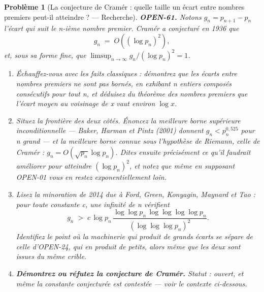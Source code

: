 \documentclass[11pt]{article}
\newtheorem{problem}{Problème}
\begin{document}
\begin{problem}[{La conjecture de Cramér : quelle taille un écart entre nombres premiers peut-il atteindre ? --- Recherche}]
\textbf{OPEN-61.} Notons $ g_n = p_{n+1} - p_n $ l'écart qui suit le n-ième nombre
premier. Cramér a conjecturé en 1936 que
\[ g_n \;=\; O\!\left( (\log p_n)^2 \right), \]
et, sous sa forme fine, que $ \limsup_{n \to \infty} g_n / (\log p_n)^2 = 1 $.
\begin{enumerate}
\item[(a)] Échauffez-vous avec les faits classiques : démontrez que les écarts entre nombres
premiers ne sont pas bornés, en exhibant n entiers composés consécutifs pour tout n, et
déduisez du théorème des nombres premiers que l'écart moyen au voisinage de x vaut environ
$ \log x $.
\item[(b)] Situez la frontière des deux côtés. Énoncez la meilleure borne supérieure
inconditionnelle --- Baker, Harman et Pintz (2001) donnent $ g_n < p_n^{0{,}525} $ pour n
grand --- et la meilleure borne connue sous l'hypothèse de Riemann, celle de Cramér :
$ g_n = O(\sqrt{p_n} \log p_n) $. Dites ensuite précisément ce qu'il faudrait améliorer
pour atteindre $ (\log p_n)^2 $, et notez que même en supposant OPEN-01 vous en restez
exponentiellement loin.
\item[(c)] Lisez la minoration de 2014 due à Ford, Green, Konyagin, Maynard et Tao : pour toute
constante c, une infinité de n vérifient
\[ g_n \;>\; c \, \log p_n \, \frac{\log\log p_n \, \log\log\log\log p_n}{(\log\log\log p_n)^2}. \]
Identifiez le point où la machinerie qui produit de \textit{grands} écarts se sépare de celle
d'OPEN-24, qui en produit de \textit{petits}, alors même que les deux sont issues du même
crible.
\item[(d)] \textbf{Démontrez ou réfutez la conjecture de Cramér.} Statut : ouvert, et même la
constante conjecturée est contestée --- voir le contexte ci-dessous.
\end{enumerate}

\end{problem}
\end{document}
